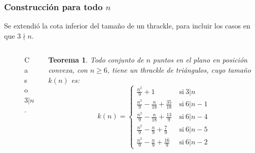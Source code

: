 \documentclass{beamer}
\newtheorem{teo}{Teorema}
\begin{document}
\begin{frame}[t]
  \frametitle{Construcción para todo $n$}
  Se extendió la cota inferior del tamaño de un thrackle, para incluir los
  casos en que $3\nmid n$.

  \begin{columns}
    \begin{column}{0.4\textwidth}
      \centering
      \begin{figure}
        \def\svgwidth{5cm}
        
        Caso $3|n$.
      \end{figure}
    \end{column}
    \begin{column}{0.5\textwidth}
      \begin{teo}
        Todo conjunto de $n$ puntos en el plano en posición convexa, con $n\ge6$,
        tiene un thrackle de triángulos, cuyo tamaño $k(n)$ es: 
        \[
          k(n) = 
          \begin{cases}
            \frac{n^2}{9}+1 &\ \text{si}\ 3|n \\
            \frac{n^2}{9}-\frac{n}{18}+\frac{35}{18} &\ \text{si}\ 6|n-1 \\
            \frac{n^2}{9}-\frac{n}{18}+\frac{13}{9}  &\ \text{si}\ 6|n-4 \\
            \frac{n^2}{9}-\frac{n}{9}+\frac{7}{9}   &\ \text{si}\ 6|n-5 \\
            \frac{n^2}{9}-\frac{n}{9}+\frac{16}{9}   &\ \text{si}\ 6|n-2
          \end{cases}
        \]
      \end{teo}
    \end{column}
  \end{columns}
\end{frame}
\end{document}
